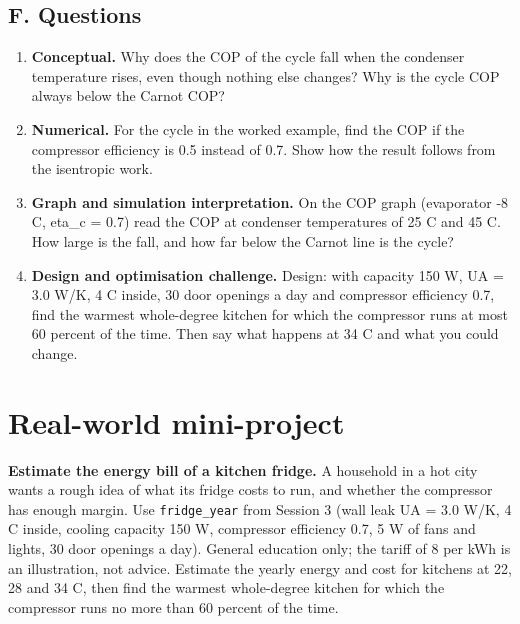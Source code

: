 \documentclass[11pt,a4paper]{article}
\begin{document}
\subsection*{F. Questions}
\begin{enumerate}[nosep]
\item \textbf{Conceptual.} Why does the COP of the cycle fall when the condenser temperature rises, even though nothing else changes? Why is the cycle COP always below the Carnot COP?
\item \textbf{Numerical.} For the cycle in the worked example, find the COP if the compressor efficiency is 0.5 instead of 0.7. Show how the result follows from the isentropic work.
\item \textbf{Graph and simulation interpretation.} On the COP graph (evaporator -8 C, eta\_c = 0.7) read the COP at condenser temperatures of 25 C and 45 C. How large is the fall, and how far below the Carnot line is the cycle?
\item \textbf{Design and optimisation challenge.} Design: with capacity 150 W, UA = 3.0 W/K, 4 C inside, 30 door openings a day and compressor efficiency 0.7, find the warmest whole-degree kitchen for which the compressor runs at most 60 percent of the time. Then say what happens at 34 C and what you could change.
\end{enumerate}

\section{Real-world mini-project}
\textbf{Estimate the energy bill of a kitchen fridge.} A household in a hot city wants a rough idea of what its fridge costs to run, and whether the compressor has enough margin. Use \texttt{fridge\_year} from Session 3 (wall leak UA = 3.0 W/K, 4 C inside, cooling capacity 150 W, compressor efficiency 0.7, 5 W of fans and lights, 30 door openings a day). General education only; the tariff of 8 per kWh is an illustration, not advice. Estimate the yearly energy and cost for kitchens at 22, 28 and 34 C, then find the warmest whole-degree kitchen for which the compressor runs no more than 60 percent of the time.
\end{document}
